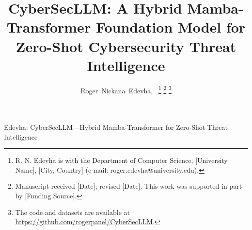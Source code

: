 \documentclass[journal]{IEEEtran}
\begin{document}
\title{CyberSecLLM: A Hybrid Mamba-Transformer Foundation Model for Zero-Shot Cybersecurity Threat Intelligence}

\author{
  Roger~Nickana~Edevha,~
  \thanks{R. N. Edevha is with the Department of Computer Science, [University Name], [City, Country] (e-mail: roger.edevha@university.edu).}
  \thanks{Manuscript received [Date]; revised [Date]. This work was supported in part by [Funding Source].}
  \thanks{The code and datasets are available at \url{https://github.com/rogerpanel/CyberSecLLM}.}
}

{Edevha: CyberSecLLM---Hybrid Mamba-Transformer for Zero-Shot Threat Intelligence}

\maketitle
\end{document}
